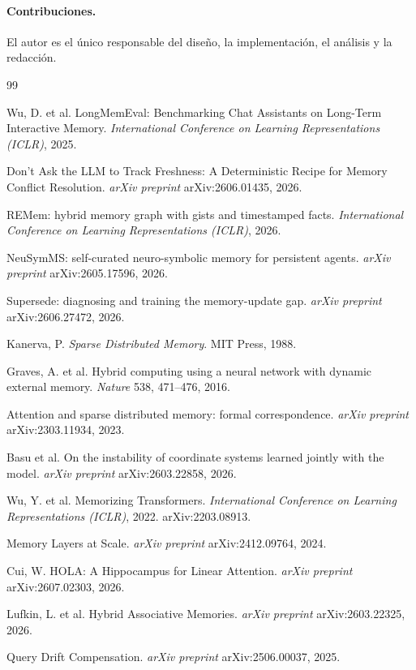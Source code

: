 \documentclass[11pt,a4paper]{article}
\begin{document}
\paragraph{Contribuciones.} El autor es el único responsable del diseño, la implementación, el
análisis y la redacción.

\begin{thebibliography}{99}

 Wu, D. et al. LongMemEval: Benchmarking Chat Assistants on Long-Term
Interactive Memory. \emph{International Conference on Learning Representations (ICLR)}, 2025.

 Don't Ask the LLM to Track Freshness: A Deterministic Recipe for Memory
Conflict Resolution. \emph{arXiv preprint} arXiv:2606.01435, 2026.

 REMem: hybrid memory graph with gists and timestamped facts.
\emph{International Conference on Learning Representations (ICLR)}, 2026.

 NeuSymMS: self-curated neuro-symbolic memory for persistent agents.
\emph{arXiv preprint} arXiv:2605.17596, 2026.

 Supersede: diagnosing and training the memory-update gap.
\emph{arXiv preprint} arXiv:2606.27472, 2026.

 Kanerva, P. \emph{Sparse Distributed Memory}. MIT Press, 1988.

 Graves, A. et al. Hybrid computing using a neural network with dynamic external
memory. \emph{Nature} 538, 471--476, 2016.

 Attention and sparse distributed memory: formal correspondence.
\emph{arXiv preprint} arXiv:2303.11934, 2023.

 Basu et al. On the instability of coordinate systems learned jointly with the model.
\emph{arXiv preprint} arXiv:2603.22858, 2026.

 Wu, Y. et al. Memorizing Transformers.
\emph{International Conference on Learning Representations (ICLR)}, 2022. arXiv:2203.08913.

 Memory Layers at Scale. \emph{arXiv preprint} arXiv:2412.09764, 2024.

 Cui, W. HOLA: A Hippocampus for Linear Attention.
\emph{arXiv preprint} arXiv:2607.02303, 2026.

 Lufkin, L. et al. Hybrid Associative Memories.
\emph{arXiv preprint} arXiv:2603.22325, 2026.

 Query Drift Compensation. \emph{arXiv preprint} arXiv:2506.00037, 2025.

\end{thebibliography}
\end{document}
